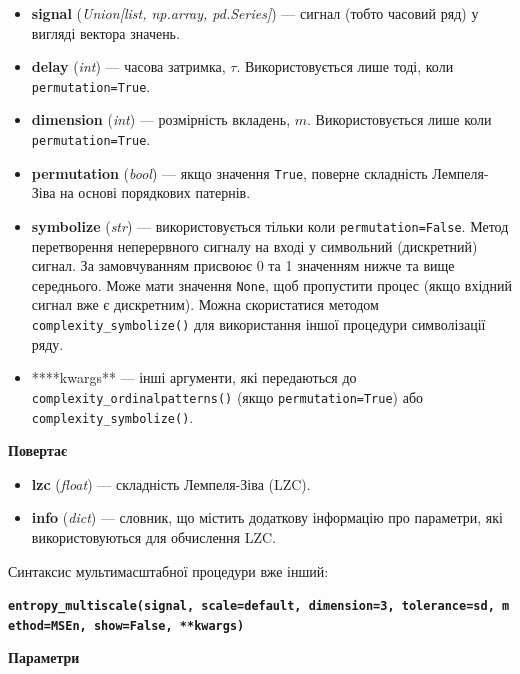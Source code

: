 \documentclass[
  letterpaper,
]{report}
\providecommand{\tightlist}{%
  \setlength{\itemsep}{0pt}\setlength{\parskip}{0pt}}\usepackage{longtable,booktabs,array}
\begin{document}
\begin{itemize}
\tightlist
\item
  \textbf{signal} (\emph{Union{[}list, np.array, pd.Series{]}}) ---
  сигнал (тобто часовий ряд) у вигляді вектора значень.
\item
  \textbf{delay} (\emph{int}) --- часова затримка, \(\tau\).
  Використовується лише тоді, коли \texttt{permutation=True}.
\item
  \textbf{dimension} (\emph{int}) --- розмірність вкладень, \(m\).
  Використовується лише коли \texttt{permutation=True}.
\item
  \textbf{permutation} (\emph{bool}) --- якщо значення \texttt{True},
  поверне складність Лемпеля-Зіва на основі порядкових патернів.
\item
  \textbf{symbolize} (\emph{str}) --- використовується тільки коли
  \texttt{permutation=False}. Метод перетворення неперервного сигналу на
  вході у символьний (дискретний) сигнал. За замовчуванням присвоює 0 та
  1 значенням нижче та вище середнього. Може мати значення
  \texttt{None}, щоб пропустити процес (якщо вхідний сигнал вже є
  дискретним). Можна скористатися методом
  \texttt{complexity\_symbolize()} для використання іншої процедури
  символізації ряду.
\item
  ****kwargs** --- інші аргументи, які передаються до
  \texttt{complexity\_ordinalpatterns()} (якщо
  \texttt{permutation=True}) або \texttt{complexity\_symbolize()}.
\end{itemize}

\textbf{Повертає}

\begin{itemize}
\tightlist
\item
  \textbf{lzc} (\emph{float}) --- складність Лемпеля-Зіва (LZC).
\item
  \textbf{info} (\emph{dict}) --- словник, що містить додаткову
  інформацію про параметри, які використовуються для обчислення LZC.
\end{itemize}

Синтаксис мультимасштабної процедури вже інший:

\textbf{\texttt{entropy\_multiscale(signal,\ scale=\textquotesingle{}default\textquotesingle{},\ dimension=3,\ tolerance=\textquotesingle{}sd\textquotesingle{},\ method=\textquotesingle{}MSEn\textquotesingle{},\ show=False,\ **kwargs)}}

\textbf{Параметри}
\end{document}
